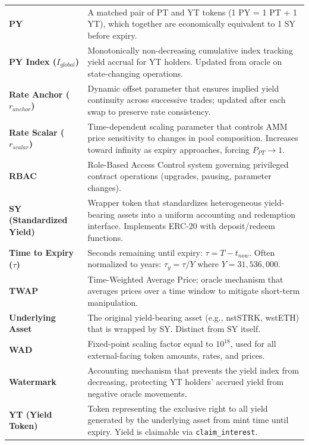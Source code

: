 \begin{center}
\begin{tabularx}{\textwidth}{l >{\raggedright\arraybackslash}X}
\textbf{PY} &
A matched pair of PT and YT tokens (1 PY = 1 PT + 1 YT), which together are economically equivalent to 1 SY before expiry. \\

\textbf{PY Index ($I_{global}$)} &
Monotonically non-decreasing cumulative index tracking yield accrual for YT holders. Updated from oracle on state-changing operations. \\

\textbf{Rate Anchor ($r_{anchor}$)} &
Dynamic offset parameter that ensures implied yield continuity across successive trades; updated after each swap to preserve rate consistency. \\

\textbf{Rate Scalar ($r_{scalar}$)} &
Time-dependent scaling parameter that controls AMM price sensitivity to changes in pool composition. Increases toward infinity as expiry approaches, forcing $P_{PT} \to 1$. \\

\textbf{RBAC} &
Role-Based Access Control system governing privileged contract operations (upgrades, pausing, parameter changes). \\

\textbf{SY (Standardized Yield)} &
Wrapper token that standardizes heterogeneous yield-bearing assets into a uniform accounting and redemption interface. Implements ERC-20 with deposit/redeem functions. \\

\textbf{Time to Expiry ($\tau$)} &
Seconds remaining until expiry: $\tau = T - t_{now}$. Often normalized to years: $\tau_y = \tau / Y$ where $Y = 31{,}536{,}000$. \\

\textbf{TWAP} &
Time-Weighted Average Price; oracle mechanism that averages prices over a time window to mitigate short-term manipulation. \\

\textbf{Underlying Asset} &
The original yield-bearing asset (e.g., nstSTRK, wstETH) that is wrapped by SY. Distinct from SY itself. \\

\textbf{WAD} &
Fixed-point scaling factor equal to $10^{18}$, used for all external-facing token amounts, rates, and prices. \\

\textbf{Watermark} &
Accounting mechanism that prevents the yield index from decreasing, protecting YT holders' accrued yield from negative oracle movements. \\

\textbf{YT (Yield Token)} &
Token representing the exclusive right to all yield generated by the underlying asset from mint time until expiry. Yield is claimable via \texttt{claim\_interest}. \\

\bottomrule
\end{tabularx}
\end{center}



